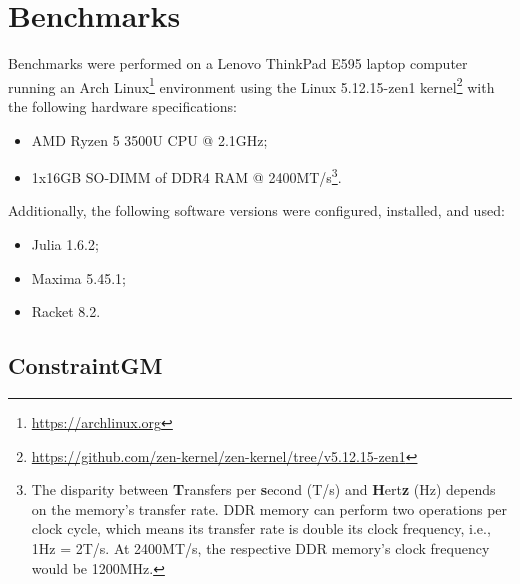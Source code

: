 %
\label{chap:eval}
\cleardoublepage{}

\section{Benchmarks}%
\label{sec:eval.perf}
Benchmarks were performed on a Lenovo ThinkPad E595 laptop computer running an
Arch Linux\footnote{\url{https://archlinux.org}} environment using the
Linux\textsuperscript{\textregistered} 5.12.15-zen1
kernel\footnote{\url{https://github.com/zen-kernel/zen-kernel/tree/v5.12.15-zen1}}
with the following hardware specifications:
%
\begin{itemize}
  \label{acro:AMD}
  \label{acro:CPU}
  \item \ac{AMD} Ryzen\textsuperscript{\texttrademark} 5 3500U \ac{CPU} @
  2.1GHz;
  \label{acro:SO-DIMM}
  \label{acro:DDR}
  \label{acro:RAM}
  \item 1x16GB \ac{SO-DIMM} of \ac{DDR}4 \ac{RAM} @ 2400MT/s\footnote{The
  disparity between \textbf{T}ransfers per \textbf{s}econd (T/s) and
  \textbf{H}ert\textbf{z} (Hz) depends on the memory's transfer rate.  \acf{DDR}
  memory can perform two operations per clock cycle, which means its transfer
  rate is double its clock frequency, i.e., 1Hz = 2T/s.  At 2400MT/s, the
  respective \ac{DDR} memory's clock frequency would be 1200MHz.}.
\end{itemize}
%
Additionally, the following software versions were configured, installed, and
used:
%
\begin{itemize}
  \item Julia 1.6.2;
  \item Maxima 5.45.1;
  \item Racket 8.2.
\end{itemize}

\subsection{ConstraintGM}%
\label{sec:eval.perf.cgm}

